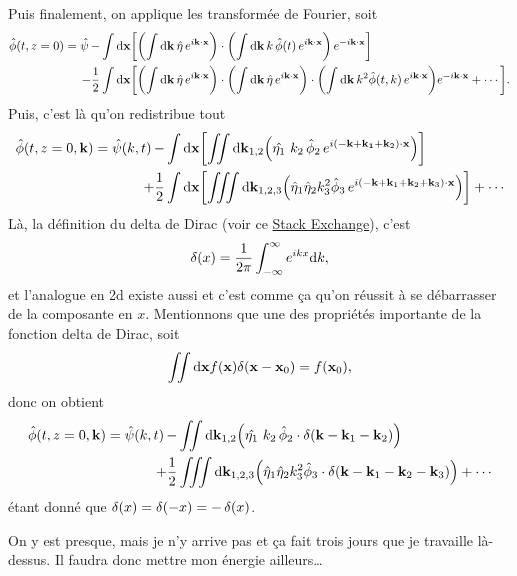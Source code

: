 \documentclass[10pt]{article}
\numberwithin{equation}{section}
\newcommand{\xx}{\vb{x}}
\begin{document}
Puis finalement, on applique les transformée de Fourier, soit
\begin{align}
   \hat{\phi}(t,z=0) = \hat{\psi}\, -& \int\dd\xx\bigg[\qty(\int \dd\vb{k}\, \hat{\eta}\, e^{i\vb{k}\cdot\xx}) \cdot\qty(\int\dd\vb{k}\, k\,\hat{\phi}(t)\,e^{i\vb{k}\cdot\xx})\,e^{-i\vb{k}\cdot\xx}\bigg]\nonumber\\
   -\frac{1}{2}&\int\dd\xx \bigg[\qty(\int \dd\vb{k}\, \hat{\eta}\, e^{i\vb{k}\cdot\xx})\cdot\qty(\int \dd\vb{k}\, \hat{\eta}\, e^{i\vb{k}\cdot\xx})\cdot \qty(\int\dd\vb{k}\,k^2 \hat{\phi}(t,k)\,e^{i\vb{k}\cdot\xx})e^{-i\vb{k}\cdot\xx}
   +\cdots\bigg].
\end{align}
Puis, c'est là qu'on redistribue tout
\begin{align}
   \hat{\phi}(t,z=0,\vb{k}) = \hat{\psi}(k,t)\, -& \int\dd\xx\qty[\iint\dd\vb{k}_{1,2}\qty( \hat{\eta_1}\, \,k_2\,\hat{\phi}_2\,e^{i(-\vb{k} + \vb{k_1}+\vb{k}_2)\cdot\xx})]\nonumber\\
   +\frac{1}{2}&\int\dd\xx \qty[\iiint \dd\vb{k}_{1,2,3}\qty( \hat{\eta}_1\hat{\eta}_2  k_3^2 \hat{\phi}_3\,e^{i(-\vb{k} + \vb{k}_1+\vb{k}_2+\vb{k}_3)\cdot\xx}) ]    + \cdots
\end{align}
Là, la définition du delta de Dirac (voir ce \href{https://math.stackexchange.com/questions/1343859/why-does-integrating-a-complex-exponential-give-the-delta-function}{Stack Exchange}), c'est
\begin{equation}
   \var(x) = \frac{1}{2\pi} \int_{-\infty}^\infty e^{ikx} \dd k,
\end{equation}
et l'analogue en 2d existe aussi et c'est comme ça qu'on réussit à se débarrasser de la composante en \(x\).
Mentionnons que une des propriétés importante de la fonction delta de Dirac, soit
\begin{equation}
   \iint \dd\xx f(\xx) \delta(\xx - \xx_0) = f(\xx_0),
\end{equation}
donc on obtient
\begin{align}
   \hat{\phi}(t,z=0,\vb{k}) = \hat{\psi}(k,t)\, -& \iint\dd\vb{k}_{1,2}\qty( \hat{\eta_1}\, \,k_2\,\hat{\phi}_2\cdot \var(\vb{k}-\vb{k}_1-\vb{k}_2))\nonumber\\
   +\frac{1}{2}&\iiint \dd\vb{k}_{1,2,3}\qty( \hat{\eta}_1\hat{\eta}_2  k_3^2 \hat{\phi}_3 \cdot\var(\vb{k} - \vb{k}_1 - \vb{k}_2 - \vb{k}_3))    + \cdots
\end{align}
étant donné que \(\var(x) = \var(-x) = -\var(x)\).\bigskip

On y est presque, mais je n'y arrive pas et ça fait trois jours que je travaille là-dessus.
Il faudra donc mettre mon énergie ailleurs\ldots{}

\printbibliography
\end{document}
